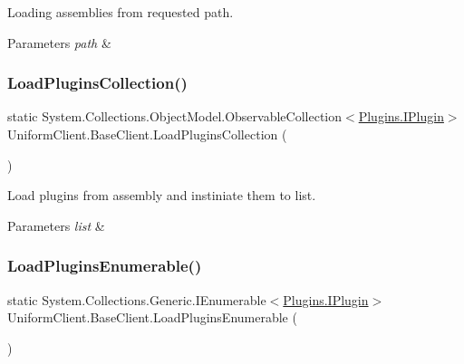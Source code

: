 Loading assemblies from requested path. 


\begin{DoxyParams}{Parameters}
{\em path} & \\
\hline
\end{DoxyParams}
\mbox{\label{class_uniform_client_1_1_base_client_a99ae0bb1dd5bef374fcedb3f873bfe8b}} 
\subsubsection{\texorpdfstring{Load\+Plugins\+Collection()}{LoadPluginsCollection()}}
{\footnotesize\ttfamily static System.\+Collections.\+Object\+Model.\+Observable\+Collection$<$\mbox{\hyperlink{interface_uniform_client_1_1_plugins_1_1_i_plugin}{Plugins.\+I\+Plugin}}$>$ Uniform\+Client.\+Base\+Client.\+Load\+Plugins\+Collection (\begin{DoxyParamCaption}{ }\end{DoxyParamCaption})\hspace{0.3cm}{\ttfamily [static]}}



Load plugins from assembly and instiniate them to list. 


\begin{DoxyParams}{Parameters}
{\em list} & \\
\hline
\end{DoxyParams}
\mbox{\label{class_uniform_client_1_1_base_client_aa60dbfa5bd8c46659aec7738193315f1}} 
\subsubsection{\texorpdfstring{Load\+Plugins\+Enumerable()}{LoadPluginsEnumerable()}}
{\footnotesize\ttfamily static System.\+Collections.\+Generic.\+I\+Enumerable$<$\mbox{\hyperlink{interface_uniform_client_1_1_plugins_1_1_i_plugin}{Plugins.\+I\+Plugin}}$>$ Uniform\+Client.\+Base\+Client.\+Load\+Plugins\+Enumerable (\begin{DoxyParamCaption}{ }\end{DoxyParamCaption})\hspace{0.3cm}{\ttfamily [static]}}



